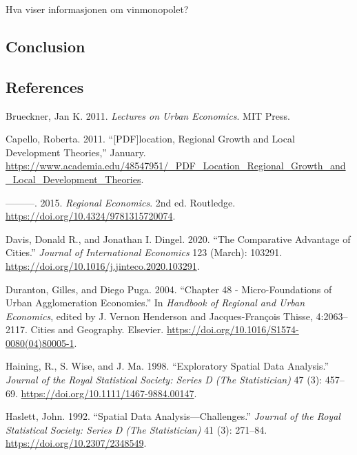 \documentclass[
  10,
  a4paper,
]{article}
\newlength{\cslhangindent}
\newlength{\cslentryspacingunit} %
\newenvironment{CSLReferences}[2] %
 {%
  \setlength{\parindent}{0pt}
  \ifodd #1
  \let\oldpar\par
  \def\par{\hangindent=\cslhangindent\oldpar}
  \fi
  \setlength{\parskip}{#2\cslentryspacingunit}
 }%
 {}
\begin{document}
Hva viser informasjonen om vinmonopolet?

\hypertarget{conclusion}{%
\subsection{Conclusion}\label{conclusion}}

\hypertarget{references}{%
\subsection*{References}\label{references}}

\hypertarget{refs}{}
\begin{CSLReferences}{1}{0}
\leavevmode{}%
Brueckner, Jan K. 2011. \emph{Lectures on Urban Economics}. MIT Press.

\leavevmode{}%
Capello, Roberta. 2011. {``{[}PDF{]}location, Regional Growth and Local
Development Theories,''} January.
\url{https://www.academia.edu/48547951/_PDF_Location_Regional_Growth_and_Local_Development_Theories}.

\leavevmode{}%
---------. 2015. \emph{Regional Economics}. 2nd ed. Routledge.
\url{https://doi.org/10.4324/9781315720074}.

\leavevmode{}%
Davis, Donald R., and Jonathan I. Dingel. 2020. {``The Comparative
Advantage of Cities.''} \emph{Journal of International Economics} 123
(March): 103291. \url{https://doi.org/10.1016/j.jinteco.2020.103291}.

\leavevmode{}%
Duranton, Gilles, and Diego Puga. 2004. {``Chapter 48 -
Micro-Foundations of Urban Agglomeration Economies.''} In \emph{Handbook
of Regional and Urban Economics}, edited by J. Vernon Henderson and
Jacques-François Thisse, 4:2063--2117. Cities and Geography. Elsevier.
\url{https://doi.org/10.1016/S1574-0080(04)80005-1}.

\leavevmode{}%
Haining, R., S. Wise, and J. Ma. 1998. {``Exploratory Spatial Data
Analysis.''} \emph{Journal of the Royal Statistical Society: Series D
(The Statistician)} 47 (3): 457--69.
\url{https://doi.org/10.1111/1467-9884.00147}.

\leavevmode{}%
Haslett, John. 1992. {``Spatial Data Analysis---Challenges.''}
\emph{Journal of the Royal Statistical Society: Series D (The
Statistician)} 41 (3): 271--84. \url{https://doi.org/10.2307/2348549}.


\end{CSLReferences}
\end{document}
